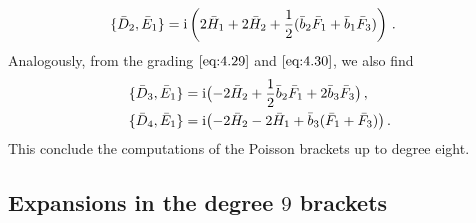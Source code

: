 \documentclass[10pt]{amsart}
\theoremstyle{definition}
\theoremstyle{corollary}
\theoremstyle{remark}
\theoremstyle{conclusion}
\begin{document}
\begin{align}
    \{\bar{D}_2, \bar{E}_{1}\}&={\rm i}\left(2\bar{H}_1+2 \bar{H}_2+\frac{1}{2}(\bar{b}_2 \bar{F}_1+\bar{b}_1 \bar{F}_3)\right) \,.
\end{align} 
Analogously, from the grading $\eqref{eq:4.29}$ and $\eqref{eq:4.30}$, we also find
\begin{align}
\{\bar{D}_3, \bar{E}_{1}\}&={\rm i}\bigl(-2 \bar{H}_2+\frac{1}{2}\bar{b}_2 \bar{F}_1+2 \bar{b}_3 \bar{F}_3\bigl)\, ,\nonumber \\
\{\bar{D}_4, \bar{E}_{1}\}&={\rm i}\bigl( -2 \bar{H}_2-2\bar{H}_1+\bar{b}_3(\bar{F}_1+\bar{F}_3)\bigl)\, .
\end{align} 
This conclude the computations of the Poisson brackets up to degree eight.
\vskip 0.5cm

\subsection{Expansions in the degree $9$ brackets}
\end{document}

